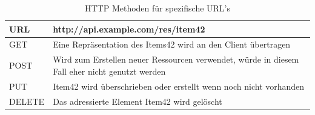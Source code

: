 \documentclass[fleqn,10.5pt,ngerman]{SelfArx}
\begin{document}
\begin{table}[hbt]
	\caption{HTTP Methoden für spezifische URL's}
	\centering
	\begin{tabular}{ |p{2cm}|p{5.5cm}|}
		\toprule
		\cmidrule(r){1-2}
		URL & \textbf{http://api.example.com/res/item42}\\
		\midrule
		GET & Eine Repräsentation des Items42 wird an den Client übertragen\\
		\midrule
		POST & Wird zum Erstellen neuer Ressourcen verwendet, würde in diesem Fall eher nicht genutzt werden\\
		\midrule
		PUT & Item42 wird überschrieben oder erstellt wenn noch nicht vorhanden\\
		\midrule
		DELETE & Das adressierte Element Item42 wird gelöscht\\
		\bottomrule
	\end{tabular}\\
	\label{tab:httptable}
\end{table}
\end{document}

